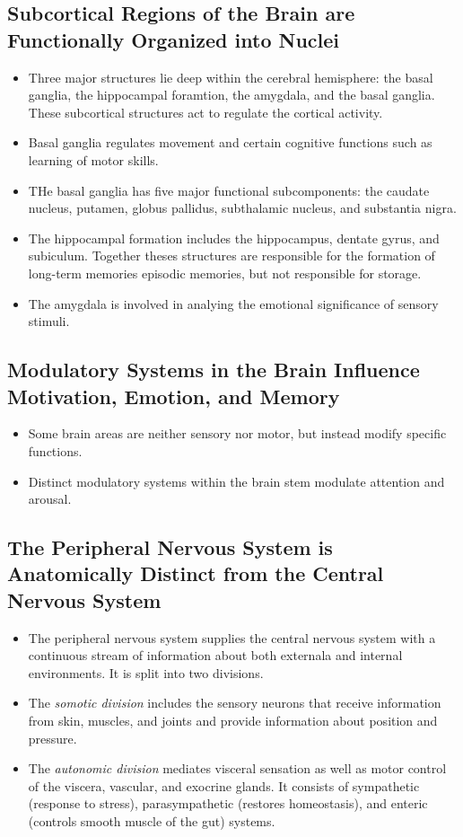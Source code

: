 \documentclass[12pt,a4paper]{article}
\begin{document}
\subsection{Subcortical Regions of the Brain are Functionally Organized into Nuclei}
\begin{itemize}
    \item Three major structures lie deep within the cerebral hemisphere: the basal ganglia, the hippocampal foramtion, the amygdala, and the basal ganglia. These subcortical structures act to regulate the cortical activity. 
    \item Basal ganglia regulates movement and certain cognitive functions such as learning of motor skills.
    \item THe basal ganglia has five major functional subcomponents: the caudate nucleus, putamen, globus pallidus, subthalamic nucleus, and substantia nigra.
    \item The hippocampal formation includes the hippocampus, dentate gyrus, and subiculum. Together theses structures are responsible for the formation of long-term memories episodic memories, but not responsible for storage.
    \item The amygdala is involved in analying the emotional significance of sensory stimuli.
\end{itemize}

\subsection{Modulatory Systems in the Brain Influence Motivation, Emotion, and Memory}
\begin{itemize}
    \item Some brain areas are neither sensory nor motor, but instead modify specific functions.
    \item Distinct modulatory systems within the brain stem modulate attention and arousal. 
\end{itemize}

\subsection{The Peripheral Nervous System is Anatomically Distinct from the Central Nervous System}
\begin{itemize}
    \item The peripheral nervous system supplies the central nervous system with a continuous stream of information about both externala and internal environments. It is split into two divisions.
    \item The \textit{somotic division} includes the sensory neurons that receive information from skin, muscles, and joints and provide information about position and pressure. 
    \item The \textit{autonomic division} mediates visceral sensation as well as motor control of the viscera, vascular, and exocrine glands. It consists of sympathetic (response to stress), parasympathetic (restores homeostasis), and enteric (controls smooth muscle of the gut) systems.
\end{itemize}
\end{document}
